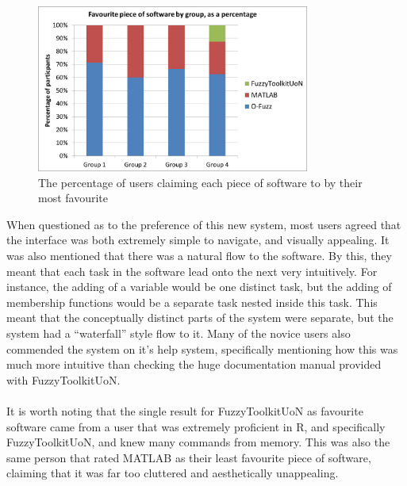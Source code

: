 \begin{figure}[ht!]
	\begin{center}
		\includegraphics[width=0.8\textwidth]{images/mostFav.png}
	\end{center}
	\vspace{-5mm}
	\captionsetup{justification=centering,margin=2cm}	
	\caption{The percentage of users claiming each piece of software to by their most favourite}
	\label{fig:mostLiked}
	\vspace{-2mm}
\end{figure}
\noindent 
When questioned as to the preference of this new system, most users agreed that the interface was both extremely simple to navigate, and visually appealing. It was also mentioned that there was a natural flow to the software. By this, they meant that each task in the software lead onto the next very intuitively. For instance, the adding of a variable would be one distinct task, but the adding of membership functions would be a separate task nested inside this task. This meant that the conceptually distinct parts of the system were separate, but the system had a ``waterfall'' style flow to it. Many of the novice users also commended the system on it's help system, specifically mentioning how this was much more intuitive than checking the huge documentation manual provided with FuzzyToolkitUoN.\ \\
\ \\
It is worth noting that the single result for FuzzyToolkitUoN as favourite software came from a user that was extremely proficient in R, and specifically FuzzyToolkitUoN, and knew many commands from memory. This was also the same person that rated MATLAB as their least favourite piece of software, claiming that it was far too cluttered and aesthetically unappealing.
	

